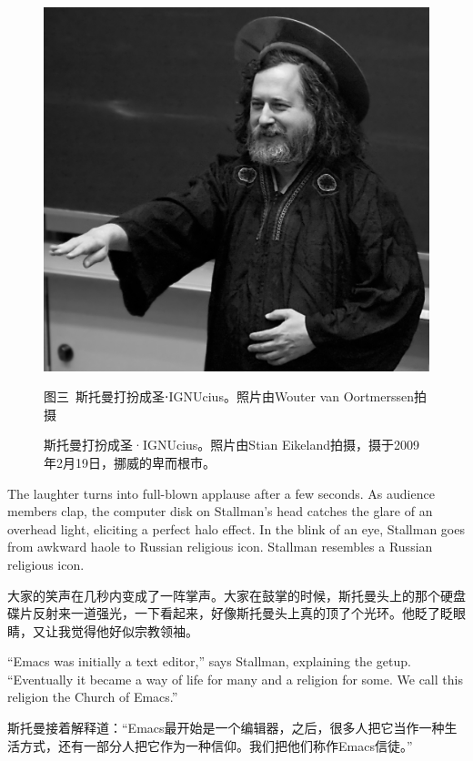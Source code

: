 \ifdefined\chs
\begin{figure}[ht] \centering
  \includegraphics[width=\textwidth]{stignucius}
  \ifdefined\vone
  \caption{图三\ 斯托曼打扮成圣⋅IGNUcius。照片由Wouter van Oortmerssen拍摄}
  \fi
  \ifdefined\vtwo
  \caption{斯托曼打扮成圣·IGNUcius。照片由Stian Eikeland拍摄，摄于2009年2月19日，挪威的卑而根市。}
  \fi

\end{figure}
\fi

\ifdefined\eng
The laughter turns into full-blown applause after a few seconds. As audience members clap, the computer disk on Stallman's head catches the glare of an overhead light, eliciting a perfect halo effect. In the blink of an eye, 
\ifdefined\vone
Stallman goes from awkward haole to Russian religious icon.
\fi
\ifdefined\vtwo
Stallman resembles a Russian religious icon.
\fi
\fi

\ifdefined\chs
大家的笑声在几秒内变成了一阵掌声。大家在鼓掌的时候，斯托曼头上的那个硬盘碟片反射来一道强光，一下看起来，好像斯托曼头上真的顶了个光环。他眨了眨眼睛，又让我觉得他好似宗教领袖。
\fi

\ifdefined\eng
``Emacs was initially a text editor,'' says Stallman, explaining the getup. ``Eventually it became a way of life for many and a religion for some. We call this religion the Church of Emacs.''
\fi

\ifdefined\chs
斯托曼接着解释道：``Emacs最开始是一个编辑器，之后，很多人把它当作一种生活方式，还有一部分人把它作为一种信仰。我们把他们称作Emacs信徒。''
\fi

